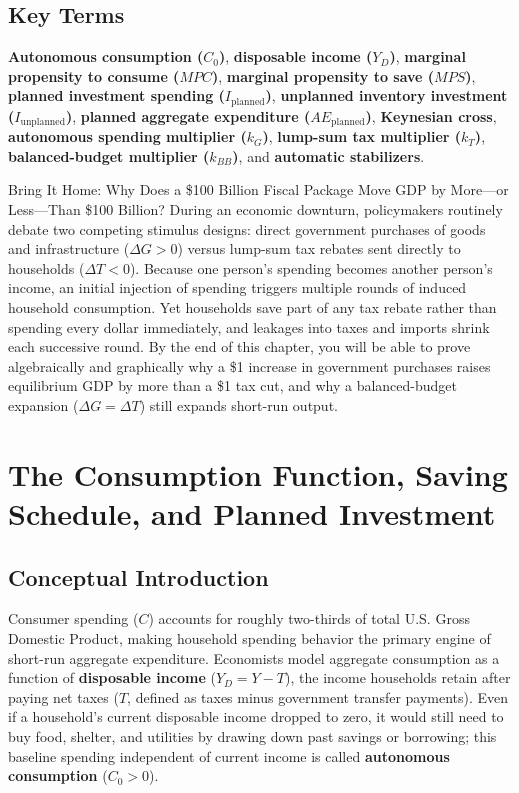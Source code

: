 \documentclass[11pt,letterpaper]{article}
\begin{document}
\subsection*{Key Terms}
\textbf{Autonomous consumption ($C_0$)}, \textbf{disposable income ($Y_D$)}, \textbf{marginal propensity to consume ($MPC$)}, \textbf{marginal propensity to save ($MPS$)}, \textbf{planned investment spending ($I_{\text{planned}}$)}, \textbf{unplanned inventory investment ($I_{\text{unplanned}}$)}, \textbf{planned aggregate expenditure ($AE_{\text{planned}}$)}, \textbf{Keynesian cross}, \textbf{autonomous spending multiplier ($k_G$)}, \textbf{lump-sum tax multiplier ($k_T$)}, \textbf{balanced-budget multiplier ($k_{BB}$)}, and \textbf{automatic stabilizers}.

\begin{examplecase}{Bring It Home: Why Does a \$100 Billion Fiscal Package Move GDP by More—or Less—Than \$100 Billion?}
During an economic downturn, policymakers routinely debate two competing stimulus designs: direct government purchases of goods and infrastructure ($\Delta G > 0$) versus lump-sum tax rebates sent directly to households ($\Delta T < 0$). Because one person's spending becomes another person's income, an initial injection of spending triggers multiple rounds of induced household consumption. Yet households save part of any tax rebate rather than spending every dollar immediately, and leakages into taxes and imports shrink each successive round. By the end of this chapter, you will be able to prove algebraically and graphically why a \$1 increase in government purchases raises equilibrium GDP by more than a \$1 tax cut, and why a balanced-budget expansion ($\Delta G = \Delta T$) still expands short-run output.
\end{examplecase}

\section{The Consumption Function, Saving Schedule, and Planned Investment}

\subsection*{Conceptual Introduction}
Consumer spending ($C$) accounts for roughly two-thirds of total U.S. Gross Domestic Product, making household spending behavior the primary engine of short-run aggregate expenditure. Economists model aggregate consumption as a function of \textbf{disposable income} ($Y_D = Y - T$), the income households retain after paying net taxes ($T$, defined as taxes minus government transfer payments). Even if a household's current disposable income dropped to zero, it would still need to buy food, shelter, and utilities by drawing down past savings or borrowing; this baseline spending independent of current income is called \textbf{autonomous consumption} ($C_0 > 0$).
\end{document}
